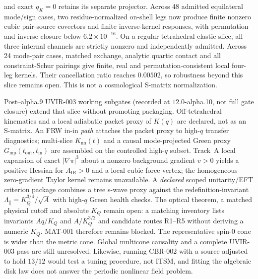 and exact $q_K=0$ retains its separate projector.  Across 48 admitted
equilateral mode/sign cases, two residue-normalized on-shell legs now produce
finite nonzero cubic pair-source covectors and finite inverse-kernel
responses, with permutation and inverse closure below $6.2\times10^{-16}$.
On a regular-tetrahedral elastic slice, all three internal channels are
strictly nonzero and independently admitted.  Across 24 mode-pair cases,
matched exchange, analytic quartic contact and all constraint-Schur pairings
give finite, real and permutation-consistent local four-leg kernels.  Their
cancellation ratio reaches $0.00502$, so robustness beyond this slice remains
open.  This is not a cosmological S-matrix normalization.

Post--alpha.9 UVIR-003 working subgates (recorded at $12.0$-alpha.10, not full
gate closure) extend that slice without promoting packaging.  Off-tetrahedral
kinematics and a local adiabatic packet proxy of $K(q)$ are declared, not as
an S-matrix.  An FRW in-in \emph{path} attaches the packet proxy to high-$q$
transfer diagnostics; multi-slice $K_{\mathrm{nn}}(t)$ and a causal
mode-projected Green proxy $G_{\mathrm{mp}}(t_{\mathrm{out}},t_{\mathrm{in}})$
are assembled on the controlled high-$q$ subset.  Track~A local expansion of
exact $|\nabla\pi|^3$ about a nonzero background gradient $v>0$ yields a
positive Hessian for $A_{\mathrm{IR}}>0$ and a local cubic force vertex; the
homogeneous zero-gradient Taylor kernel remains unavailable.  A
\emph{declared} scoped unitarity/EFT criterion package combines a tree
s-wave proxy against the redefinition-invariant
$\Lambda_\parallel=K_Q^{3/4}/\sqrt{A}$ with high-$q$ Green health checks.
The optical theorem, a matched physical cutoff and absolute $K_Q$ remain
open: a matching inventory lists invariants $Aq/K_Q$ and $A/K_Q^{3/2}$ and
candidate routes R1--R5 without deriving a numeric $K_Q$.  MAT-001 therefore
remains blocked.  The representative spin-0 cone is wider than the metric
cone.  Global multicone causality and a complete UVIR-003 pass are still
unresolved.  Likewise, running CBR-002 with a source adjusted to hold
$13/12$ would test a tuning procedure, not ITSM, and fitting the algebraic
disk law does not answer the periodic nonlinear field problem.
